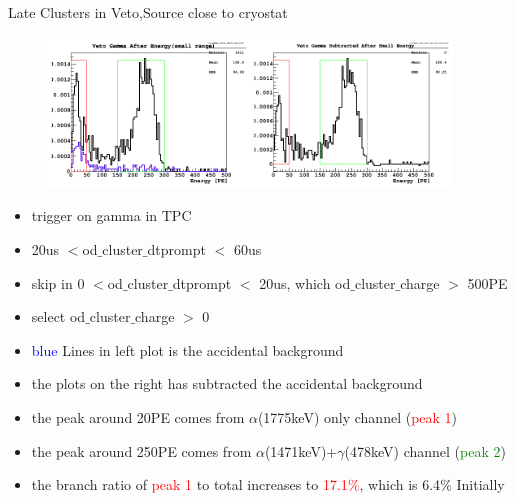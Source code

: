 \documentclass[9pt]{beamer}
\begin{document}
\begin{frame}{Late Clusters in Veto,Source close to cryostat}
\begin{figure}
\includegraphics[height= 4cm, width=\textwidth]{nv_gamma_after_small_ene_subtracted_Feb7PM.png}
\end{figure}
\begin{itemize}
[bullet]
\item trigger on gamma in TPC
\item 20us $<$od$\_$cluster$\_$dtprompt $<$ 60us
\item skip in 0 $<$od$\_$cluster$\_$dtprompt $<$ 20us, which od$\_$cluster$\_$charge $>$ 500PE
\item  select od$\_$cluster$\_$charge $>$ 0
\item \textcolor{blue}{blue} Lines in left plot is the accidental background 
\item the plots on the right has subtracted the accidental background 
\item the peak around 20PE comes from $\alpha$(1775keV) only channel (\textcolor{red}{peak 1})
\item the peak around 250PE comes from $\alpha$(1471keV)+$\gamma$(478keV) channel (\textcolor{green}{peak 2})
\item the branch ratio of \textcolor{red}{peak 1} to total increases to \textcolor{red}{17.1$\%$}, which is 6.4$\%$ Initially 
\end{itemize}
\end{frame}
\end{document}
